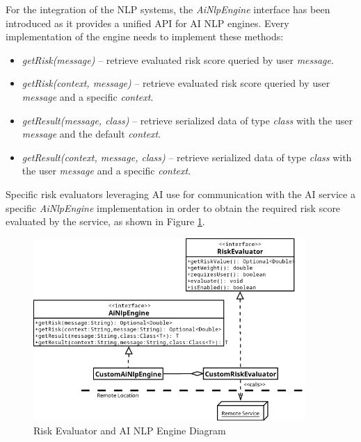 \newpage
For the integration of the NLP systems, the \textit{AiNlpEngine} interface has been introduced as it provides a unified API for AI NLP engines.
Every implementation of the engine needs to implement these methods:

\begin{itemize}
    \item \textit{getRisk(message)} -- retrieve evaluated risk score queried by user \textit{message}. 
    \item \textit{getRisk(context, message)} -- retrieve evaluated risk score queried by user \textit{message} and a specific \textit{context}. 
    \item \textit{getResult(message, class)} -- retrieve serialized data of type \textit{class} with the user \textit{message} and the default \textit{context}.
    \item \textit{getResult(context, message, class)} -- retrieve serialized data of type \textit{class} with the user \textit{message} and a specific \textit{context}.
\end{itemize}

Specific risk evaluators leveraging AI use for communication with the AI service a specific \textit{AiNlpEngine} implementation in order to obtain the required risk score evaluated by the service, as shown in Figure \ref{fig:ai-engine-remote-diagram}. 

\begin{figure}[htbp]
  \centering
  \includegraphics[width=0.92\textwidth]{img/sections/5-design/ai-engine-remote.png}
  \caption{Risk Evaluator and AI NLP Engine Diagram}
  \label{fig:ai-engine-remote-diagram}
\end{figure}

\newpage

